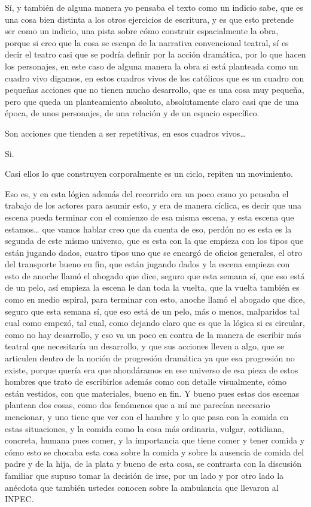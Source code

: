 Sí, y también de alguna manera yo pensaba el texto como un indicio sabe, que es una cosa bien distinta a los otros ejercicios de escritura, y es que esto pretende ser como un indicio, una pista sobre cómo construir espacialmente la obra, porque si creo que la cosa se escapa de la narrativa convencional teatral, sí es decir el teatro casi que se podría definir por la acción dramática, por lo que hacen los personajes, en este caso de alguna manera la obra si está planteada como un cuadro vivo digamos, en estos cuadros vivos de los católicos que es un cuadro con pequeñas acciones que no tienen mucho desarrollo, que es una cosa muy pequeña, pero que queda un planteamiento absoluto, absolutamente claro casi que de una época, de unos personajes, de una relación y de un espacio específico.

Son acciones que tienden a ser repetitivas, en esos cuadros vivos…

Si.

Casi ellos lo que construyen corporalmente es un ciclo, repiten un movimiento.

Eso es, y en esta lógica además del recorrido era un poco como yo pensaba el trabajo de los actores para asumir esto, y era de manera cíclica, es decir que una escena pueda terminar con el comienzo de esa misma escena, y esta escena que estamos… que vamos hablar creo que da cuenta de eso, perdón no es esta es la segunda de este mismo universo, que es esta con la que empieza con los tipos que están jugando dados, cuatro tipos uno que se encargó de oficios generales, el otro del transporte bueno en fin, que están jugando dados y la escena empieza con esto de anoche llamó el abogado que dice, seguro que esta semana sí, que eso está de un pelo, así empieza la escena le dan toda la vuelta, que la vuelta también es como en medio espiral, para terminar con esto, anoche llamó el abogado que dice, seguro que esta semana sí, que eso está de un pelo, más o menos, malparidos tal cual como empezó, tal cual, como dejando claro que es que la lógica si es circular, como no hay desarrollo, y eso va un poco en contra de la manera de escribir más teatral que necesitaría un desarrollo, y que sus acciones lleven a algo, que se articulen dentro de la noción de progresión dramática ya que esa progresión no existe, porque quería era que ahondáramos en ese universo de esa pieza de estos hombres que trato de escribirlos además como con detalle visualmente, cómo están vestidos, con que materiales, bueno en fin.
Y bueno pues estas dos escenas plantean dos cosas, como dos fenómenos que a mí me parecían necesario mencionar, y uno tiene que ver con el hambre y lo que pasa con la comida en estas situaciones, y la comida como la cosa más ordinaria, vulgar, cotidiana, concreta, humana pues comer, y la importancia que tiene comer y tener comida y cómo esto se chocaba esta cosa sobre la comida y sobre la ausencia de comida del padre y de la hija, de la plata y bueno de esta cosa, se contrasta con la discusión familiar que supuso tomar la decisión de irse, por un lado y por otro lado la anécdota que también ustedes conocen sobre la ambulancia que llevaron al INPEC.


